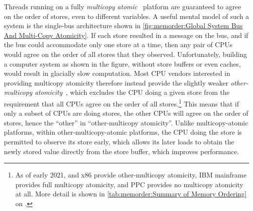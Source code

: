 Threads running on a fully
\emph{multicopy atomic}~\cite{Stone:1995:SP:623262.623912}
platform are guaranteed
to agree on the order of stores, even to different variables.
A useful mental model of such a system is the single-bus architecture
shown in
\cref{fig:memorder:Global System Bus And Multi-Copy Atomicity}.
If each store resulted in a message on the bus, and if the bus could
accommodate only one store at a time, then any pair of CPUs would
agree on the order of all stores that they observed.
Unfortunately, building a computer system as shown in the figure, without
store buffers or even caches, would result in glacially slow computation.
Most CPU vendors interested in providing multicopy atomicity therefore
instead provide the slightly weaker
\emph{other-multicopy atomicity}~\cite[Section B2.3]{ARMv8A:2017},
which excludes the CPU doing a given store from the requirement that all
CPUs agree on the order of all stores.\footnote{
	As of early 2021,  and x86 provide other-multicopy atomicity,
	IBM mainframe provides full multicopy atomicity, and PPC
	provides no multicopy atomicity at all.
	More detail is shown in
	\cref{tab:memorder:Summary of Memory Ordering}
	on
	.}
This means that if only a subset of CPUs are doing stores, the
other CPUs will agree on the order of stores, hence the ``other''
in ``other-multicopy atomicity''.
Unlike multicopy-atomic platforms, within other-multicopy-atomic platforms,
the CPU doing the store is permitted to observe its
store early, which allows its later loads to obtain the newly stored
value directly from the store buffer, which improves performance.

